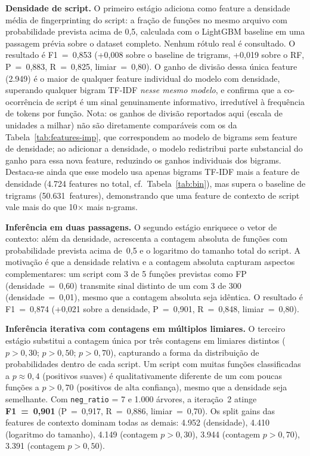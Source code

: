 \textbf{Densidade de script.} O primeiro estágio adiciona como feature a densidade
média de fingerprinting do script: a fração de funções no mesmo arquivo com
probabilidade prevista acima de 0,5, calculada com o LightGBM baseline em uma
passagem prévia sobre o dataset completo. Nenhum rótulo real é consultado. O
resultado é F1~=~0,853 (+0,008 sobre o baseline de trigrams, +0,019 sobre o RF,
P~=~0,883, R~=~0,825, limiar~=~0,80). O ganho de divisão dessa única feature (2.949)
é o maior de qualquer feature individual do modelo com densidade, superando qualquer bigram
TF-IDF \emph{nesse mesmo modelo}, e confirma que a co-ocorrência de script é um sinal genuinamente
informativo, irredutível à frequência de tokens por função. Nota: os ganhos de divisão
reportados aqui (escala de unidades a milhar) não são diretamente comparáveis com
os da Tabela~\ref{tab:features-imp}, que correspondem ao modelo de bigrams sem feature
de densidade; ao adicionar a densidade, o modelo redistribui parte substancial do
ganho para essa nova feature, reduzindo os ganhos individuais dos bigrams. Destaca-se ainda que
esse modelo usa apenas bigrams TF-IDF mais a feature de densidade (4.724 features
no total, cf.\ Tabela~\ref{tab:bin}), mas supera o baseline de trigrams
(50.631~features), demonstrando que uma feature de contexto de script vale mais do
que 10$\times$ mais n-grams.

\textbf{Inferência em duas passagens.} O segundo estágio enriquece o vetor de
contexto: além da densidade, acrescenta a contagem absoluta de funções com
probabilidade prevista acima de~0,5 e o logaritmo do tamanho total do script.
A motivação é que a densidade relativa e a contagem absoluta capturam aspectos
complementares: um script com 3 de 5 funções previstas como FP
(densidade~=~0,60) transmite sinal distinto de um com 3 de 300
(densidade~=~0,01), mesmo que a contagem absoluta seja idêntica. O resultado é
F1~=~0,874 (+0,021 sobre a densidade, P~=~0,901, R~=~0,848, limiar~=~0,80).

\textbf{Inferência iterativa com contagens em múltiplos limiares.} O terceiro
estágio substitui a contagem única por três contagens em limiares distintos
($p{>}0{,}30$; $p{>}0{,}50$; $p{>}0{,}70$), capturando a forma da
distribuição de probabilidades dentro de cada script. Um script com muitas funções
classificadas a $p \approx 0{,}4$ (positivos suaves) é qualitativamente diferente
de um com poucas funções a $p{>}0{,}70$ (positivos de alta confiança), mesmo que a
densidade seja semelhante. Com \texttt{neg\_ratio} = 7 e 1.000 árvores, a iteração~2 atinge
\textbf{F1~=~0,901} (P~=~0,917, R~=~0,886, limiar~=~0,70). Os split gains das features de contexto dominam todas as demais: 4.952
(densidade), 4.410 (logaritmo do tamanho), 4.149 (contagem $p{>}0{,}30$),
3.944 (contagem $p{>}0{,}70$), 3.391 (contagem $p{>}0{,}50$).

